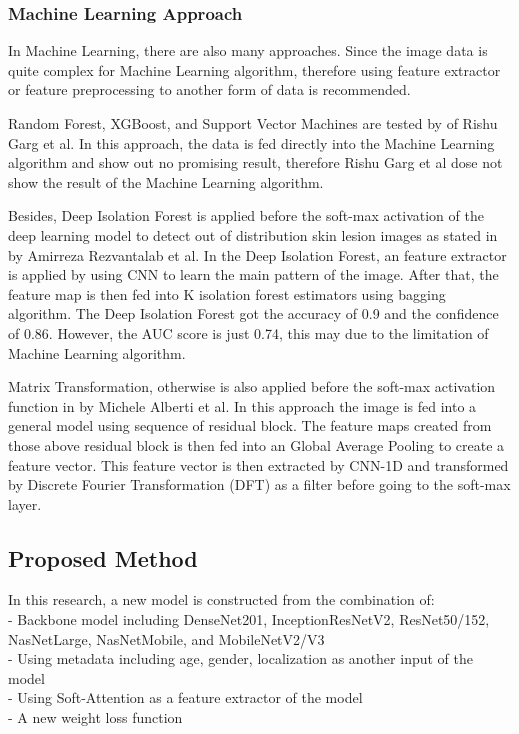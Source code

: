 \documentclass[sensors,article,submit,pdftex,moreauthors]{Definitions/mdpi}
\begin{document}
{\subsubsection{Machine Learning Approach}
In Machine Learning, there are also many approaches. Since the image data is quite complex for Machine Learning algorithm, therefore using feature extractor or feature preprocessing to another form of data is recommended.

Random Forest, XGBoost, and Support Vector Machines are tested by \mbox{\cite{03798}} of Rishu Garg et al. In this approach, the data is fed directly into the Machine Learning algorithm and show out no promising result, therefore Rishu Garg et al dose not show the result of the Machine Learning algorithm. 

Besides, Deep Isolation Forest is applied before the soft-max activation of the deep learning model to detect out of distribution skin lesion images as stated in \mbox{\cite{09365}} by Amirreza Rezvantalab et al. In the Deep Isolation Forest, an feature extractor is applied by using CNN to learn the main pattern of the image. After that, the feature map is then fed into K isolation forest estimators using bagging algorithm. The Deep Isolation Forest got the accuracy of 0.9 and the confidence of 0.86. However, the AUC score is just 0.74, this may due to the limitation of Machine Learning algorithm. 

Matrix Transformation, otherwise is also applied before the soft-max activation function in \mbox{\cite{05045}} by Michele Alberti et al. In this approach the image is fed into a general model using sequence of residual block. The feature maps created from those above residual block is then fed into an Global Average Pooling to create a feature vector. This feature vector is then extracted by CNN-1D and transformed by Discrete Fourier Transformation (DFT) as a filter before going to the soft-max layer. 
}

\subsection{Proposed Method}
In this research, a new model is constructed from the combination of:\\
- Backbone model including DenseNet201, InceptionResNetV2, ResNet50/152, NasNetLarge, NasNetMobile, and MobileNetV2/V3\\
- Using metadata including age, gender, localization as another input of the model\\
- Using Soft-Attention as a feature extractor of the model\\
- A new weight loss function
\end{document}
